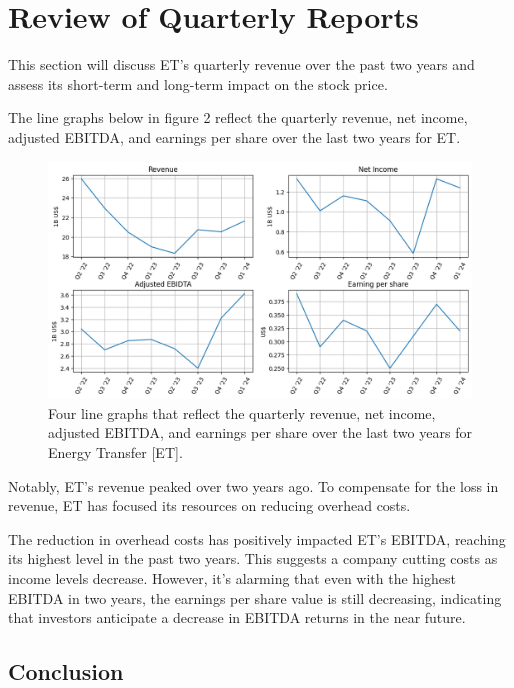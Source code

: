 \documentclass[9pt,a4paper,twoside]{tau}
\begin{document}
\section{Review of Quarterly Reports}

    This section will discuss ET's quarterly revenue over the past two years and assess its short-term and long-term impact on the stock price.

    The line graphs below in figure 2 reflect the quarterly revenue, net income, adjusted EBITDA, and earnings per share over the last two years for ET.

    \begin{figure}[H]
        \centering
        \includegraphics[width=0.85\columnwidth]{Figures/Revenue_NetIncome_AdjustedEBIDTA_GAAPearningPerShare.png}
        \caption{Four line graphs that reflect the quarterly revenue, net income, adjusted EBITDA, and earnings per share over the last two years for Energy Transfer [ET]\cite{alpha-vantage-2024}.}
        \label{fig:figure}            
    \end{figure}

    Notably, ET's revenue peaked over two years ago. To compensate for the loss in revenue, ET has focused its resources on reducing overhead costs.

    The reduction in overhead costs has positively impacted ET's EBITDA, reaching its highest level in the past two years. This suggests a company cutting costs as income levels decrease. However, it's alarming that even with the highest EBITDA in two years, the earnings per share value is still decreasing, indicating that investors anticipate a decrease in EBITDA returns in the near future.

    \subsection{Conclusion}
\end{document}
